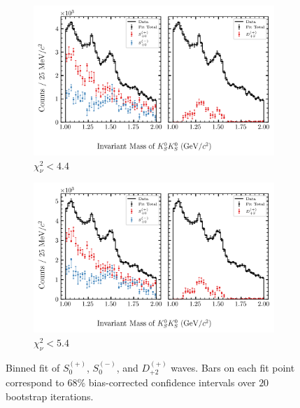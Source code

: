 \begin{figure}[htbp]
    \begin{subfigure}{0.45\textwidth}
        \includegraphics[width=\linewidth]{figures/binned_fit_chisqdof_4.4_splot_D_1s_2b_phase_factor_waves29099_uncertainty_bootstrap-CI-BC.png}
        \caption{$\chi^2_\nu < 4.4$}
    \end{subfigure}
    \hfill
    \begin{subfigure}{0.45\textwidth}
        \includegraphics[width=\linewidth]{figures/binned_fit_chisqdof_5.4_splot_D_1s_2b_phase_factor_waves29099_uncertainty_bootstrap-CI-BC.png}
        \caption{$\chi^2_\nu < 5.4$}
    \end{subfigure}

    \caption{Binned fit of $S_{0}^{(+)}$, $S_{0}^{(-)}$, and $D_{+2}^{(+)}$ waves. Bars on each fit point correspond to $68\%$ bias-corrected confidence intervals over $20$ bootstrap iterations.}
    \label{fig:binned-fit-all-Spn-D2p}
\end{figure}

